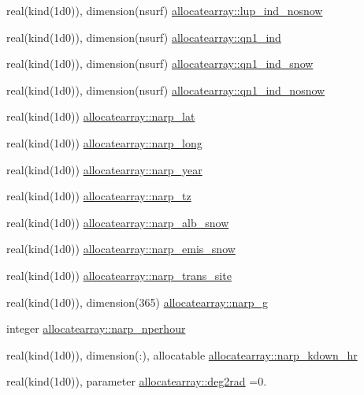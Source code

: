 \begin{DoxyCompactItemize}
real(kind(1d0)), dimension(nsurf) \hyperlink{namespaceallocatearray_a99b72c6fb88f3204dc332f38601a92fb}{allocatearray\+::lup\+\_\+ind\+\_\+nosnow}
\item 
real(kind(1d0)), dimension(nsurf) \hyperlink{namespaceallocatearray_ae1c8dcf595053e7c0c88f68acf975058}{allocatearray\+::qn1\+\_\+ind}
\item 
real(kind(1d0)), dimension(nsurf) \hyperlink{namespaceallocatearray_aa0f581ad59f5d12178c78ed717aa0cdf}{allocatearray\+::qn1\+\_\+ind\+\_\+snow}
\item 
real(kind(1d0)), dimension(nsurf) \hyperlink{namespaceallocatearray_a098df5ee70b2d0e75e10d6a2af40b6a2}{allocatearray\+::qn1\+\_\+ind\+\_\+nosnow}
\item 
real(kind(1d0)) \hyperlink{namespaceallocatearray_a7b5080e39a3fff641d0430e27a214f73}{allocatearray\+::narp\+\_\+lat}
\item 
real(kind(1d0)) \hyperlink{namespaceallocatearray_a4cead817e8c2a1093714592c8fd4647c}{allocatearray\+::narp\+\_\+long}
\item 
real(kind(1d0)) \hyperlink{namespaceallocatearray_abd08fc8e7202cd8df8d0989842b0b5a6}{allocatearray\+::narp\+\_\+year}
\item 
real(kind(1d0)) \hyperlink{namespaceallocatearray_a273ce22e21b65f11ee34d94178fb83d8}{allocatearray\+::narp\+\_\+tz}
\item 
real(kind(1d0)) \hyperlink{namespaceallocatearray_a74f3fec744807c8f27837cb556e268ee}{allocatearray\+::narp\+\_\+alb\+\_\+snow}
\item 
real(kind(1d0)) \hyperlink{namespaceallocatearray_a87a39d461e1ca42ee5eec5e53f9be96c}{allocatearray\+::narp\+\_\+emis\+\_\+snow}
\item 
real(kind(1d0)) \hyperlink{namespaceallocatearray_aa57823a8cf6ecf5dd9831b5e713405a5}{allocatearray\+::narp\+\_\+trans\+\_\+site}
\item 
real(kind(1d0)), dimension(365) \hyperlink{namespaceallocatearray_a8c88a2f2cc3c9a8e17a46321db44dda9}{allocatearray\+::narp\+\_\+g}
\item 
integer \hyperlink{namespaceallocatearray_a4ade212246deb8928d13ab60941f568d}{allocatearray\+::narp\+\_\+nperhour}
\item 
real(kind(1d0)), dimension(\+:), allocatable \hyperlink{namespaceallocatearray_a4866b7da54272d82fa9edc9ae61e1ea8}{allocatearray\+::narp\+\_\+kdown\+\_\+hr}
\item 
real(kind(1d0)), parameter \hyperlink{namespaceallocatearray_a2e733560c2b2c287dce276bfb7eb32db}{allocatearray\+::deg2rad} =0.

\end{DoxyCompactItemize}
